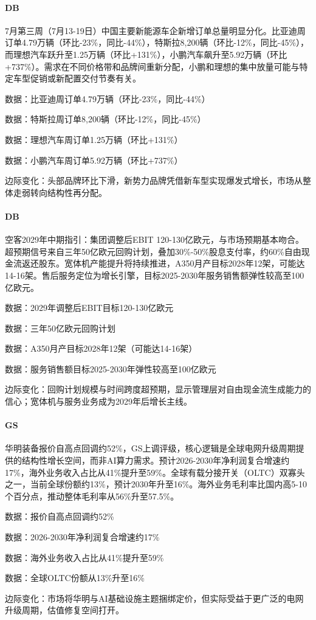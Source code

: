 \documentclass[11pt]{ctexart}
\begin{document}
\paragraph{DB} 7月第三周（7月13-19日）中国主要新能源车企新增订单总量明显分化。比亚迪周订单4.79万辆（环比-23\%，同比-44\%），特斯拉8,200辆（环比-12\%，同比-45\%），而理想汽车跃升至1.25万辆（环比+131\%），小鹏汽车飙升至5.92万辆（环比+737\%）。需求在不同价格带和品牌间重新分配，小鹏和理想的集中放量可能与特定车型促销或新配置交付节奏有关。
{\small\color{refgray}数据：比亚迪周订单4.79万辆（环比-23\%，同比-44\%）\par}
{\small\color{refgray}数据：特斯拉周订单8,200辆（环比-12\%，同比-45\%）\par}
{\small\color{refgray}数据：理想汽车周订单1.25万辆（环比+131\%）\par}
{\small\color{refgray}数据：小鹏汽车周订单5.92万辆（环比+737\%）\par}
{\small\color{refgray}边际变化：头部品牌环比下滑，新势力品牌凭借新车型实现爆发式增长，市场从整体走弱转向结构性再分配。\par}
\paragraph{DB} 空客2029年中期指引：集团调整后EBIT 120-130亿欧元，与市场预期基本吻合。超预期信号来自三年50亿欧元回购计划，叠加30\%-50\%股息支付率，约60\%自由现金流返还股东。宽体机产能提升将持续推进，A350月产目标2028年12架，可能达14-16架。售后服务定位为增长引擎，目标2025-2030年服务销售额弹性较高至100亿欧元。
{\small\color{refgray}数据：2029年调整后EBIT目标120-130亿欧元\par}
{\small\color{refgray}数据：三年50亿欧元回购计划\par}
{\small\color{refgray}数据：A350月产目标2028年12架（可能达14-16架）\par}
{\small\color{refgray}数据：服务销售额目标2025-2030年弹性较高至100亿欧元\par}
{\small\color{refgray}边际变化：回购计划规模与时间跨度超预期，显示管理层对自由现金流生成能力的信心；宽体机与服务业务成为2029年后增长主线。\par}
\paragraph{GS} 华明装备报价自高点回调约52\%，GS上调评级，核心逻辑是全球电网升级周期提供的结构性增长空间，而非AI算力需求。预计2026-2030年净利润复合增速约17\%，海外业务收入占比从41\%提升至59\%。全球有载分接开关（OLTC）双寡头之一，当前全球份额约13\%，预计2030年升至16\%。海外业务毛利率比国内高5-10个百分点，推动整体毛利率从56\%升至57.5\%。
{\small\color{refgray}数据：报价自高点回调约52\%\par}
{\small\color{refgray}数据：2026-2030年净利润复合增速约17\%\par}
{\small\color{refgray}数据：海外业务收入占比从41\%提升至59\%\par}
{\small\color{refgray}数据：全球OLTC份额从13\%升至16\%\par}
{\small\color{refgray}边际变化：市场将华明与AI基础设施主题捆绑定价，但实际受益于更广泛的电网升级周期，估值修复空间打开。\par}
\end{document}
